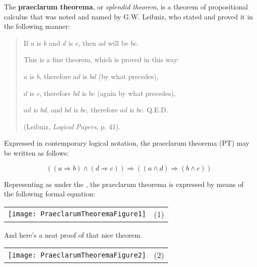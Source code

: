 \documentclass[12pt]{article}
\begin{document}

The \textbf{praeclarum theorema}, or \textit{splendid theorem}, is a theorem of propositional calculus that was noted and named by G.W. Leibniz, who stated and proved it in the following manner:

\begin{quote}
If $a$ is $b$ and $d$ is $c$, then $ad$ will be $bc$.

This is a fine theorem, which is proved in this way:

$a$ is $b$, therefore $ad$ is $bd$ (by what precedes),

$d$ is $c$, therefore $bd$ is $bc$ (again by what precedes),

$ad$ is $bd$, and $bd$ is $bc$, therefore $ad$ is $bc$.  Q.E.D.

(Leibniz, \textit{Logical Papers}, p. 41).
\end{quote}

Expressed in contemporary logical notation, the praeclarum theorema (PT) may be written as follows:

\[ ((a \Rightarrow b) \land (d \Rightarrow c)) \Rightarrow ((a \land d) \Rightarrow (b \land c)) \]

Representing  as  under the , the praeclarum theorema is expressed by means of the following formal equation:

\begin{center}\begin{tabular}{cc}
\texttt{[image: PraeclarumTheoremaFigure1]} & (1) \\
\end{tabular}\end{center}

And here's a neat proof of that nice theorem.

\begin{center}\begin{tabular}{cc}
\texttt{[image: PraeclarumTheoremaFigure2]} & (2) \\
\end{tabular}\end{center}
\end{document}
